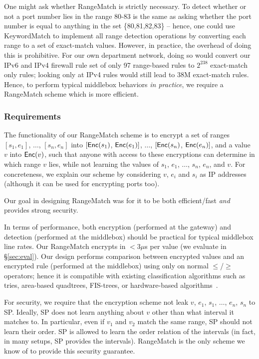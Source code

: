 One might ask whether RangeMatch is strictly necessary. To detect whether or not a port number lies in the range 80-83 is the same as asking whether the port number is equal to anything in the set \{80,81,82,83\} -- hence, one could use KeywordMatch to implement all range detection operations by converting each range to a set of exact-match values.
However, in practice, the overhead of doing this is prohibitive.
For our own department network, doing so would convert our IPv6 and IPv4 firewall rule set of only 97 range-based rules to $2^{238}$ exact-match only rules; looking only at IPv4 rules would still lead to 38M exact-match rules.
Hence, to perform typical middlebox behaviors {\it in practice}, we require a RangeMatch scheme which is more efficient.

\subsubsection{Requirements}
The functionality of our RangeMatch scheme is to encrypt a set of ranges $[s_1, e_1]$, $\dots$, $[s_n, e_n]$ into  $[\mathsf{Enc}(s_1)$, $\mathsf{Enc}(e_1)]$, $\dots$, $[\mathsf{Enc}(s_n)$,  $\mathsf{Enc}(e_n)]$, and a value $v$ into $\mathsf{Enc}(v)$, such that anyone with access to these encryptions can determine in which range $v$ lies, while not learning the values of $s_1$, $e_1$, $\dots$, $s_n$, $e_n$, and $v$. 
For concreteness, we explain our scheme by considering $v$, $e_i$ and $s_i$ as IP addresses (although it can be used for encrypting ports too).

Our goal in designing RangeMatch was for it to be both efficient/fast {\em and} provides strong security.

In terms of performance, both encryption (performed at the gateway) and detection (performed at the middlebox) should be practical for typical middlebox line rates.
Our RangeMatch encrypts in $< 3\mu$s per value (we evaluate in \S\ref{sec:eval}).
Our design performs comparison between encrypted values and an encrypted rule (performed at the middlebox) using only on normal $\leq$/$\geq$ operators; hence it is compatible with existing classification algorithms such as tries, area-based quadtrees, FIS-trees, or hardware-based algorithms~\cite{packet_classif}.

For security, we require that the encryption scheme  not leak $v$, $e_1$, $s_1$, $\dots$, $e_n$, $s_n$ to SP.
Ideally, SP does not learn anything about $v$ other than what interval it matches to. In  particular, even if $v_1$ and $v_2$ match the same range, SP should not learn their order. SP is allowed to learn the order relation of the intervals (in fact, in many setups, SP provides the intervals). 
RangeMatch is the only scheme we know of to provide this security guarantee.

